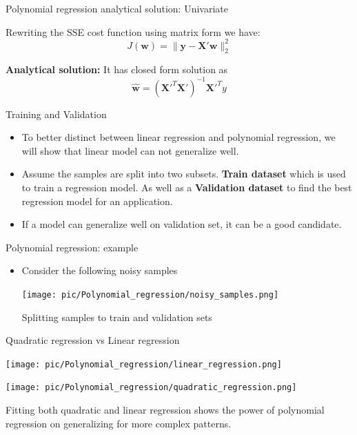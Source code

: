 \documentclass[serif, aspectratio=169]{beamer}
\begin{document}
\begin{frame}{Polynomial regression analytical solution: Univariate}
    \item Rewriting the SSE cost function using matrix form we have:
    \[
    J(\mathbf{w}) = \| \mathbf{y} - \mathbf{X'} \mathbf{w} \|_2^2
    \]
    \item \textbf{Analytical solution:} It has closed form solution as $$ \hat{\mathbf{w}} = \left( \mathbf{X'}^T\mathbf{X'} \right)^{-1} \mathbf{X'}^T y $$
\end{frame}

\begin{frame}{Training and Validation}
    \begin{itemize}
        \item To better distinct between linear regression and polynomial regression, we will show that linear model can not generalize well.
        \item Assume the samples are split into two subsets. \textbf{Train dataset} which is used to train a regression model. As well as a \textbf{Validation dataset} to find the best regression model for an application.
        \item If a model can generalize well on validation set, it can be a good candidate.
    \end{itemize}
\end{frame}

\begin{frame}{Polynomial regression: example}
    \begin{itemize}
        \item Consider the following noisy samples
        \begin{center}
            \texttt{[image: pic/Polynomial\_regression/noisy\_samples.png]}
        \end{center}
        \vfile
        \begin{center}
            Splitting samples to train and validation sets
        \end{center}
    \end{itemize}
\end{frame}

\begin{frame}{Quadratic regression vs Linear regression}
    \begin{minipage}{0.48\textwidth}
        \centering
        \texttt{[image: pic/Polynomial\_regression/linear\_regression.png]}
    \end{minipage} %
    \begin{minipage}{0.48\textwidth}
        \centering
        \texttt{[image: pic/Polynomial\_regression/quadratic\_regression.png]}
    \end{minipage}
    \vfile
    \begin{center}
        Fitting both quadratic and linear regression shows the power of polynomial regression on generalizing for more complex patterns.
    \end{center}
\end{frame}
\end{document}
